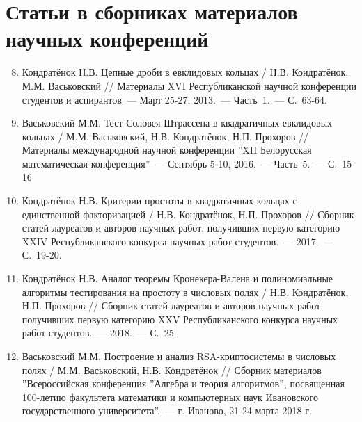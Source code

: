 \documentclass[_00_autoref.tex]{subfiles}
\begin{document}
\vspace{-4ex}
\section*{\fontsize{14}{15}\selectfont Статьи в сборниках материалов научных конференций}
\vspace{-4ex}

\begin{enumerate}
\setcounter{enumi}{7}

    \item \label{source:Republican_Scientific_Conference_of_Students_and_Postgraduates_2013}
    Кондратёнок Н.В. Цепные дроби в евклидовых кольцах / Н.В. Кондратёнок, М.М. Васьковский // Материалы XVI Республиканской научной конференции студентов и аспирантов~--- Март 25-27, 2013.~--- Часть~1.~--- С.~63-64.

    \item \label{source:XII_Belarussian_math_conference_2016}
    Васьковский М.М. Тест Соловея-Штрассена в квадратичных евклидовых кольцах / М.М. Васьковский, Н.В. Кондратёнок, Н.П. Прохоров // Материалы международной научной конференции ''XII Белорусская математическая конференция''~--- Сентябрь 5-10, 2016.~--- Часть~5.~--- С.~15-16

    \item \label{source:Collection_of_articles_by_laureates_2017}
    Кондратёнок Н.В. Критерии простоты в квадратичных кольцах с единственной факторизацией / Н.В. Кондратёнок, Н.П. Прохоров // Сборник статей лауреатов и авторов научных работ, получивших первую категорию XXIV Республиканского конкурса научных работ студентов.~--- 2017.~--- С.~19-20.

    \item \label{source:Collection_of_articles_by_laureates_2018}
    Кондратёнок Н.В. Аналог теоремы Кронекера-Валена и полиномиальные алгоритмы тестирования на простоту в числовых полях / Н.В. Кондратёнок, Н.П. Прохоров // Сборник статей лауреатов и авторов научных работ, получивших первую категорию XXV Республиканского конкурса научных работ студентов.~--- 2018.~--- С.~25.

    \item \label{source:Algebra_and_theory_of_algorithms}
    Васьковский М.М. Построение и анализ RSA-криптосистемы в числовых полях / М.М. Васьковский, Н.В. Кондратёнок // Сборник материалов ''Всероссийская конференция ''Алгебра и теория алгоритмов'', посвященная 100-летию факультета математики и компьютерных наук Ивановского государственного университета''.~--- г. Иваново, 21-24 марта 2018 г.


\end{enumerate}
\end{document}
